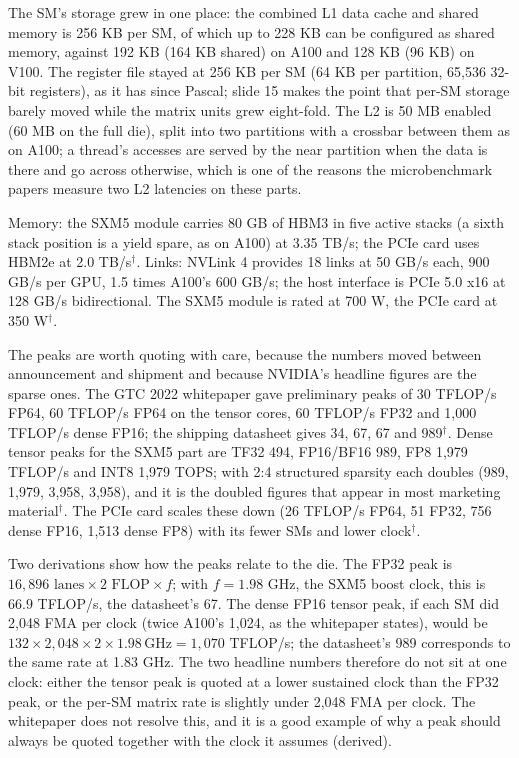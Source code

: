 \documentclass[11pt,letterpaper]{article}
\begin{document}
The SM's storage grew in one place: the combined L1 data cache and shared memory is 256 KB per SM, of which up to 228 KB can be configured as shared memory, against 192 KB (164 KB shared) on A100 and 128 KB (96 KB) on V100. The register file stayed at 256 KB per SM (64 KB per partition, 65{,}536 32-bit registers), as it has since Pascal; slide 15 makes the point that per-SM storage barely moved while the matrix units grew eight-fold. The L2 is 50 MB enabled (60 MB on the full die), split into two partitions with a crossbar between them as on A100; a thread's accesses are served by the near partition when the data is there and go across otherwise, which is one of the reasons the microbenchmark papers measure two L2 latencies on these parts.

Memory: the SXM5 module carries 80 GB of HBM3 in five active stacks (a sixth stack position is a yield spare, as on A100) at 3.35 TB/s; the PCIe card uses HBM2e at 2.0 TB/s$^\dagger$. Links: NVLink 4 provides 18 links at 50 GB/s each, 900 GB/s per GPU, 1.5 times A100's 600 GB/s; the host interface is PCIe 5.0 x16 at 128 GB/s bidirectional. The SXM5 module is rated at 700 W, the PCIe card at 350 W$^\dagger$.

The peaks are worth quoting with care, because the numbers moved between announcement and shipment and because NVIDIA's headline figures are the sparse ones. The GTC 2022 whitepaper gave preliminary peaks of 30 TFLOP/s FP64, 60 TFLOP/s FP64 on the tensor cores, 60 TFLOP/s FP32 and 1{,}000 TFLOP/s dense FP16; the shipping datasheet gives 34, 67, 67 and 989$^\dagger$. Dense tensor peaks for the SXM5 part are TF32 494, FP16/BF16 989, FP8 1{,}979 TFLOP/s and INT8 1{,}979 TOPS; with 2:4 structured sparsity each doubles (989, 1{,}979, 3{,}958, 3{,}958), and it is the doubled figures that appear in most marketing material$^\dagger$. The PCIe card scales these down (26 TFLOP/s FP64, 51 FP32, 756 dense FP16, 1{,}513 dense FP8) with its fewer SMs and lower clock$^\dagger$.

Two derivations show how the peaks relate to the die. The FP32 peak is $16{,}896 \text{ lanes} \times 2 \text{ FLOP} \times f$; with $f = 1.98$ GHz, the SXM5 boost clock, this is $66.9$ TFLOP/s, the datasheet's 67. The dense FP16 tensor peak, if each SM did 2{,}048 FMA per clock (twice A100's 1{,}024, as the whitepaper states), would be $132\times2{,}048\times2\times1.98\,\text{GHz} = 1{,}070$ TFLOP/s; the datasheet's 989 corresponds to the same rate at 1.83 GHz. The two headline numbers therefore do not sit at one clock: either the tensor peak is quoted at a lower sustained clock than the FP32 peak, or the per-SM matrix rate is slightly under 2{,}048 FMA per clock. The whitepaper does not resolve this, and it is a good example of why a peak should always be quoted together with the clock it assumes (derived).
\end{document}
